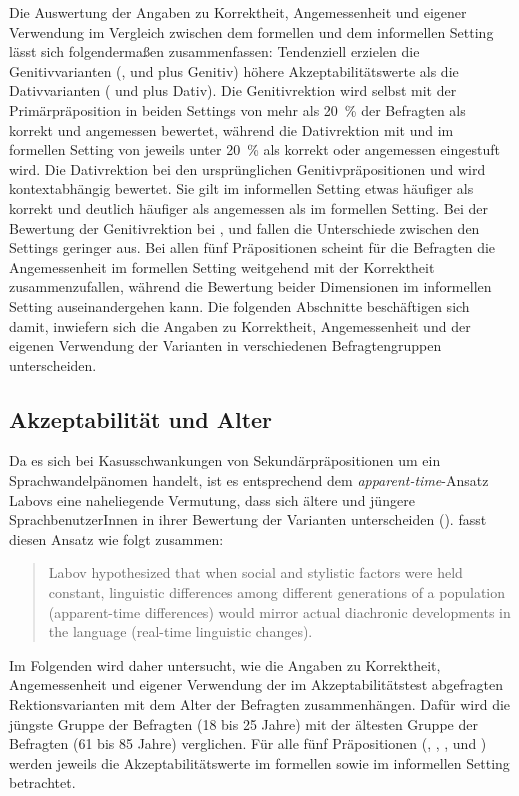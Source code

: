 Die Auswertung der Angaben zu Korrektheit, Angemessenheit und eigener Verwendung im Vergleich zwischen dem formellen und dem informellen Setting lässt sich folgendermaßen zusammenfassen:
Tendenziell erzielen die Genitivvarianten (\dank{}, \gegenueber{} und  plus Genitiv) höhere Akzeptabilitätswerte als die Dativvarianten (\wegen{} und \waehrend{} plus Dativ). 
Die Genitivrektion wird selbst mit der Primärpräposition  in beiden Settings von mehr als 20~\% der Befragten als korrekt und angemessen bewertet, während die Dativrektion mit \wegen{} und \waehrend{} im formellen Setting von jeweils unter 20~\% als korrekt oder angemessen eingestuft wird. 
Die Dativrektion bei den ursprünglichen Genitivpräpositionen \wegen{} und \waehrend{} wird kontextabhängig bewertet.
Sie gilt im informellen Setting etwas häufiger als korrekt und deutlich häufiger als angemessen als im formellen Setting. 
Bei der Bewertung der Genitivrektion bei \dank{}, \gegenueber{} und  fallen die Unterschiede zwischen den Settings geringer aus.  
Bei allen fünf Präpositionen scheint für die Befragten die Angemessenheit im formellen Setting weitgehend mit der Korrektheit zusammenzufallen, während die Bewertung beider Dimensionen im informellen Setting auseinandergehen kann. 
Die folgenden Abschnitte beschäftigen sich damit, inwiefern sich die Angaben zu Korrektheit, Angemessenheit und der eigenen Verwendung der Varianten in verschiedenen Befragtengruppen unterscheiden. 
\subsection{Akzeptabilität und Alter}
\label{sec:ErgAkzNachAlter}
Da es sich bei Kasusschwankungen von Sekundärpräpositionen um ein Sprachwandelpänomen handelt, ist es entsprechend dem \textit{apparent-time}-Ansatz Labovs eine naheliegende Vermutung, dass sich ältere und jüngere SprachbenutzerInnen in ihrer Bewertung der Varianten unterscheiden (\citealp[s.][40]{Preston.1991}). 
\citet[313]{Bailey.2004} fasst diesen Ansatz wie folgt zusammen:
\begin{quote}Labov hypothesized that when social and stylistic factors were held constant, linguistic differences among different generations of a population (apparent-time differences) would mirror actual diachronic developments in the language (real-time linguistic changes).\end{quote}
Im Folgenden wird daher untersucht, wie die Angaben zu Korrektheit, Angemessenheit und eigener Verwendung der im Akzeptabilitätstest abgefragten Rektionsvarianten mit dem Alter der Befragten zusammenhängen. 
Dafür wird die jüngste Gruppe der Befragten (18 bis 25 Jahre) mit der ältesten Gruppe der Befragten (61 bis 85 Jahre) verglichen. 
Für alle fünf Präpositionen (\wegen{}, \waehrend{}, \dank{}, \gegenueber{} und ) werden jeweils die Akzeptabilitätswerte im formellen sowie im informellen Setting betrachtet.

